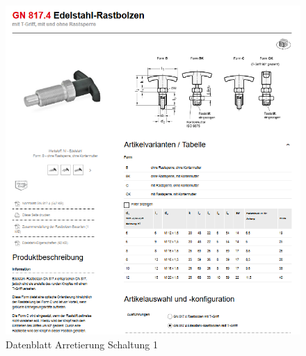 \newpage
\begin{figure}[H]
	\includegraphics[width=1.1\textwidth,keepaspectratio]{figures/Rastbolzen.png}
	\caption{Datenblatt Arretierung Schaltung 1 \protect\cite{bib:www:rastbolzen}}
	\label{fig:Reibbelag}
\end{figure}
